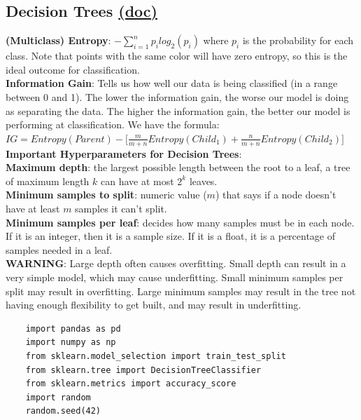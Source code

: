 \documentclass[11pt, a4paper]{article}
\begin{document}
\begin{spacing}{1.1}
	\subsection{Decision Trees \href{https://scikit-learn.org/stable/modules/tree.html}{(doc)}}
	\textbf{(Multiclass) Entropy}: $-\sum_{i=1}^np_i log_2(p_i)$ where $p_i$ is the probability for each class. Note that points with the same color will have zero entropy, so this is the ideal outcome for classification. \vspace*{2mm}\\
	\textbf{Information Gain}: Tells us how well our data is being classified (in a range between 0 and 1). The lower the information gain, the worse our model is doing as separating the data. The higher the information gain, the better our model is performing at classification. We have the formula: \\$IG = Entropy(Parent) - \Big[\frac{m}{m+n}Entropy(Child_1)+\frac{n}{m+n}Entropy(Child_2)\Big]$ \vspace*{2mm}\\
	\textbf{Important Hyperparameters for Decision Trees}: \vspace*{1mm} \\
	\textbf{Maximum depth}: the largest possible length between the root to a leaf, a tree of maximum length $k$ can have at most $2^k$ leaves. \vspace*{2mm}\\
	\textbf{Minimum samples to split}: numeric value ($m$) that says if a node doesn't have at least $m$ samples it can't split.\vspace*{2mm}\\
	\textbf{Minimum samples per leaf}: decides how many samples must be in each node. If it is an integer, then it is a sample size. If it is a float, it is a percentage of samples needed in a leaf. \vspace*{2mm}\\
	\textbf{WARNING}: Large depth often causes overfitting. Small depth can result in a very simple model, which may cause underfitting. Small minimum samples per split may result in overfitting. Large minimum samples may result in the tree not having enough flexibility to get built, and may result in underfitting. \newpage

	\begin{lstlisting}
	import pandas as pd
	import numpy as np
	from sklearn.model_selection import train_test_split
	from sklearn.tree import DecisionTreeClassifier
	from sklearn.metrics import accuracy_score
	import random
	random.seed(42)
	

\end{lstlisting}
\end{spacing}
\end{document}
